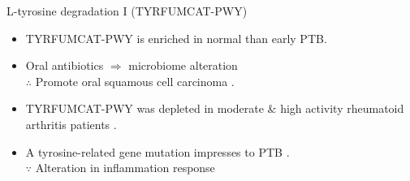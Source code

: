 \documentclass{beamer}
\begin{document}
\begin{frame}[allowframebreaks]
        \begin{block}{L-tyrosine degradation I (TYRFUMCAT-PWY)}
            \begin{itemize}
                \item TYRFUMCAT-PWY is enriched in normal than early PTB.
                \item Oral antibiotics $\Rightarrow$ microbiome alteration \\
                    $\therefore$ Promote oral squamous cell carcinoma \cite{TYRFUMCAT-PWY-1}.
                \item TYRFUMCAT-PWY was depleted in moderate \& high activity rheumatoid arthritis patients \cite{TYRFUMCAT-PWY-2}.
                \item A tyrosine-related gene mutation impresses to PTB \cite{TYRFUMCAT-PWY-3}. \\
                    $\because$ Alteration in inflammation response
            \end{itemize}
        \end{block}
    \end{frame}
\end{document}
